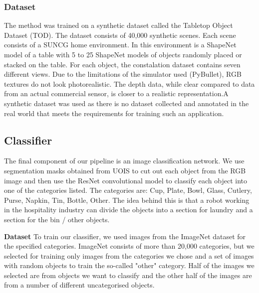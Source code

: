 \documentclass[10pt,twocolumn,letterpaper]{article}
\begin{document}
\subsubsection{Dataset}
The method was trained on a synthetic dataset called the Tabletop Object Dataset (TOD). The dataset consists of 40,000 synthetic scenes. Each scene consists of a SUNCG \cite{Song_Yu_Zeng_Chang_Savva_Funkhouser_2016} home environment. In this environment is a ShapeNet \cite{Chang_Funkhouser_Guibas_Hanrahan_Huang_Li_Savarese_Savva_Song_Su_et} model of a table with 5 to 25 ShapeNet \cite{Chang_Funkhouser_Guibas_Hanrahan_Huang_Li_Savarese_Savva_Song_Su_et} models of objects randomly placed or stacked on the table. For each object, the constalation dataset contains seven different views. Due to the limitations of the simulator used (PyBullet), RGB textures do not look photorealistic. The depth data, while clear compared to data from an actual commercial sensor, is closer to a realistic representation.A synthetic dataset was used as there is no dataset collected and annotated in the real world that meets the requirements for training such an application.



\subsection{Classifier}
The final component of our pipeline is an image classification network. We use segmentation masks obtained from UOIS to cut out each object from the RGB image and then use the ResNet \cite{He_Zhang_Ren_Sun_2015} convolutional model to classify each object into one of the categories listed. The categories are: Cup, Plate, Bowl, Glass, Cutlery, Purse, Napkin, Tin, Bottle, Other. The idea behind this is that a robot working in the hospitality industry can divide the objects into a section for laundry and a section for the bin / other objects.

\textbf{Dataset}
To train our classifier, we used images from the ImageNet dataset for the specified categories. ImageNet consists of more than 20,000 categories, but we selected for training only images from the categories we chose and a set of images with random objects to train the so-called "other" category. Half of the images we selected are from objects we want to classify and the other half of the images are from a number of different uncategorised objects.
\end{document}
